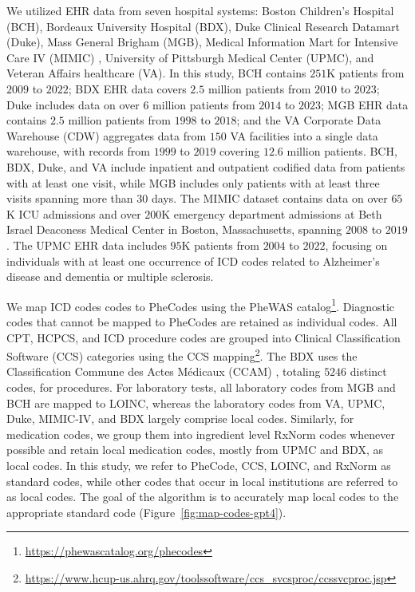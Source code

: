 \documentclass{article}
\begin{document}
We utilized EHR data from seven hospital systems: Boston Children’s Hospital (BCH), Bordeaux University Hospital (BDX), Duke Clinical Research Datamart (Duke), Mass General Brigham (MGB), Medical Information Mart for Intensive Care IV (MIMIC)  \citep{mimiciV}, University of Pittsburgh Medical Center (UPMC), and Veteran Affairs healthcare (VA). In this study, BCH contains $251$K patients from $2009$ to $2022$; BDX EHR data covers $2.5$ million patients from $2010$ to $2023$; Duke includes data on over $6$ million patients from $2014$ to $2023$; MGB EHR data contains $2.5$ million patients from $1998$ to $2018$; and the VA Corporate Data Warehouse (CDW) aggregates data from $150$ VA facilities into a single data warehouse, with records from $1999$ to $2019$ covering $12.6$ million patients. BCH, BDX, Duke, and VA include inpatient and outpatient codified data from patients with at least one visit, while MGB includes only patients with at least three visits spanning more than $30$ days. The MIMIC dataset contains data on over $65$K ICU admissions and over $200$K emergency department admissions at Beth Israel Deaconess Medical Center in Boston, Massachusetts, spanning $2008$ to $2019$. The UPMC EHR data includes $95$K patients from $2004$ to $2022$, focusing on individuals with at least one occurrence of ICD codes related to Alzheimer’s disease and dementia  or multiple sclerosis. 


We map ICD codes codes to PheCodes using the PheWAS catalog\footnote{\url{https://phewascatalog.org/phecodes}}. Diagnostic codes that cannot be mapped to PheCodes are retained as individual codes. All CPT, HCPCS, and ICD procedure codes are grouped into Clinical Classification Software (CCS) categories using the CCS mapping\footnote{\url{https://www.hcup-us.ahrq.gov/toolssoftware/ccs_svcsproc/ccssvcproc.jsp}}. The BDX uses the Classification Commune des Actes Médicaux (CCAM) \cite{bousquet2010evaluation}, totaling $5246$ distinct codes, for procedures. 
For laboratory tests, all laboratory codes from MGB and BCH are mapped to LOINC, whereas the laboratory codes from VA, UPMC, Duke, MIMIC-IV, and BDX largely comprise local codes. Similarly, for medication codes, we group them into ingredient level RxNorm codes whenever possible and retain local medication codes, mostly from UPMC and BDX, as local codes. In this study, we refer to PheCode, CCS, LOINC, and RxNorm as standard codes, while other codes that occur in local institutions are referred to as local codes. The goal of the algorithm is to accurately map local codes to the appropriate
standard code (Figure~\ref{fig:map-codes-gpt4}).
\end{document}
